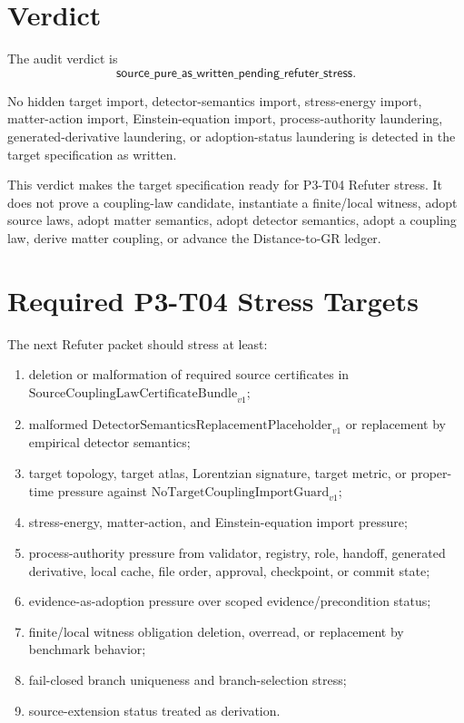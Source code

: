 \documentclass[11pt]{article}
\newcommand{\AuditVerdict}{\mathsf{source\_pure\_as\_written\_pending\_refuter\_stress}}
\newcommand{\SCLBundle}{\mathrm{SourceCouplingLawCertificateBundle}_{v1}}
\newcommand{\DetPlaceholder}{\mathrm{DetectorSemanticsReplacementPlaceholder}_{v1}}
\newcommand{\NTGuard}{\mathrm{NoTargetCouplingImportGuard}_{v1}}
\begin{document}
\section{Verdict}

The audit verdict is
\[
  \AuditVerdict .
\]

No hidden target import, detector-semantics import, stress-energy import,
matter-action import, Einstein-equation import, process-authority laundering,
generated-derivative laundering, or adoption-status laundering is detected in
the target specification as written.

This verdict makes the target specification ready for P3-T04 Refuter stress.
It does not prove a coupling-law candidate, instantiate a finite/local
witness, adopt source laws, adopt matter semantics, adopt detector semantics,
adopt a coupling law, derive matter coupling, or advance the Distance-to-GR
ledger.

\section{Required P3-T04 Stress Targets}

The next Refuter packet should stress at least:

\begin{enumerate}[label=(\alph*)]
  \item deletion or malformation of required source certificates in
        \(\SCLBundle\);
  \item malformed \(\DetPlaceholder\) or replacement by empirical detector
        semantics;
  \item target topology, target atlas, Lorentzian signature, target metric,
        or proper-time pressure against \(\NTGuard\);
  \item stress-energy, matter-action, and Einstein-equation import pressure;
  \item process-authority pressure from validator, registry, role, handoff,
        generated derivative, local cache, file order, approval, checkpoint,
        or commit state;
  \item evidence-as-adoption pressure over scoped evidence/precondition
        status;
  \item finite/local witness obligation deletion, overread, or replacement by
        benchmark behavior;
  \item fail-closed branch uniqueness and branch-selection stress;
  \item source-extension status treated as derivation.
\end{enumerate}
\end{document}
